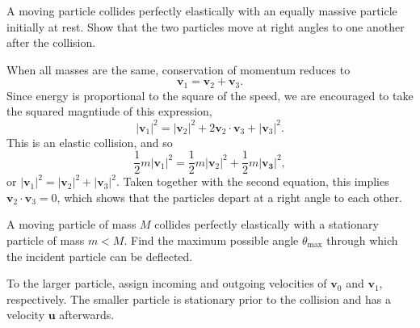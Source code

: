 \documentclass[../feynman-lectures-on-physics.tex]{subfiles}
\begin{document}
\begin{questions}
\question A moving particle collides perfectly elastically with an equally
  massive particle initially at rest. Show that the two particles move at
  right angles to one another after the collision.

  \begin{solution}
    When all masses are the same, conservation of momentum reduces to
    \[
      \mathbf{v}_1 = \mathbf{v}_2 + \mathbf{v}_3.
    \]
    Since energy is proportional to the square of the speed, we are encouraged
    to take the squared magntiude of this expression,
    \[
      |\mathbf{v}_1|^2 = |\mathbf{v}_2|^2 + 2\mathbf{v}_2\cdot\mathbf{v}_3 + |\mathbf{v}_3|^2.
    \]
    This is an elastic collision, and so
    \[
      \frac{1}{2}m|\mathbf{v}_1|^2 = \frac{1}{2}m|\mathbf{v}_2|^2 + \frac{1}{2}m|\mathbf{v_3}|^2,
    \]
    or $|\mathbf{v}_1|^2 = |\mathbf{v}_2|^2 + |\mathbf{v}_3|^2$. Taken together
    with the second equation, this implies $\mathbf{v}_2\cdot\mathbf{v}_3=0$,
    which shows that the particles depart at a right angle to each other.
  \end{solution}

\question A moving particle of mass $M$ collides perfectly elastically with a
  stationary particle of mass $m<M$. Find the maximum possible angle
  $\theta_{\text{max}}$ through which the incident particle can be deflected.

  \begin{solution}
    To the larger particle, assign incoming and outgoing velocities of
    $\mathbf{v}_0$ and $\mathbf{v}_1$, respectively. The smaller particle is
    stationary prior to the collision and has a velocity $\mathbf{u}$
    afterwards.


\end{solution}
\end{questions}
\end{document}
